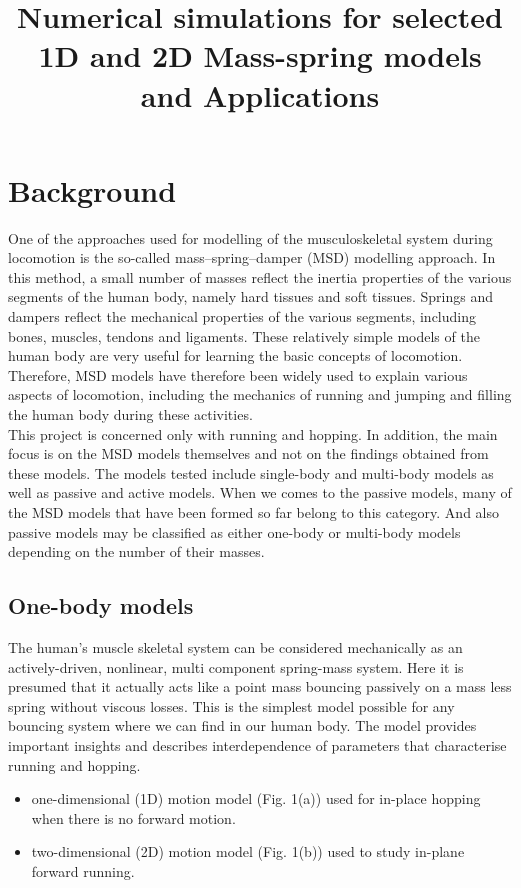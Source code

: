 \documentclass[extendedabs]{AAVL}
\begin{document}
\title{Numerical simulations for selected 1D and 2D Mass-spring
models and Applications}




\maketitle
\section{Background}

\noindent

One of the approaches used for modelling of the musculoskeletal system during locomotion is the so-called mass–spring–damper (MSD) modelling
approach. In this method, a small number of masses reflect the inertia properties of the various segments of the human body, namely hard tissues and soft tissues. Springs and dampers reflect the mechanical properties of the various segments, including bones, muscles, tendons and ligaments. These relatively simple models of the human body are very useful for learning the basic concepts of locomotion. Therefore, MSD models have therefore been widely used to explain various aspects of locomotion, including the mechanics of running and jumping and filling the human body during these activities.\\

This project is concerned only with running and hopping. In addition, the main focus is on the MSD models themselves and not on the findings obtained from these models. The models tested include single-body and multi-body models as well as passive and active models. When we comes to the passive models, many of the MSD models that have been formed so far belong to this category. And also passive models may be classified as either one-body or multi-body models depending on the number of their masses. 
\subsection{One-body models}
The human’s muscle skeletal system can be considered mechanically as an actively-driven, nonlinear, multi component spring-mass system. Here it is presumed that it actually acts like a point mass bouncing passively on a mass less spring without viscous losses. This is the simplest model possible for any bouncing system where we can find in our human body. The model provides important insights and describes
interdependence of parameters that characterise running and hopping. 
\begin{itemize}
    \item one-dimensional (1D) motion model (Fig. 1(a))
used for in-place hopping when there is no forward motion.
    \item two-dimensional (2D) motion model (Fig. 1(b))
used to study in-plane forward running.
\end{itemize}
\end{document}
